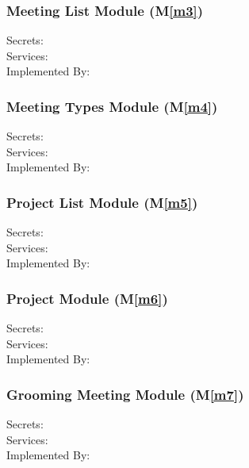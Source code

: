 \documentclass[12pt, titlepage]{article}
\newcommand{\mref}[1]{M\ref{#1}}
\begin{document}
\subsubsection{Meeting List Module (\mref{m3})}
\begin{description}
    \item[Secrets:] 
    \item[Services:] 
    \item[Implemented By:] 
\end{description}

\subsubsection{Meeting Types Module (\mref{m4})}
\begin{description}
    \item[Secrets:] 
    \item[Services:] 
    \item[Implemented By:] 
\end{description}

\subsubsection{Project List Module (\mref{m5})}
\begin{description}
    \item[Secrets:] 
    \item[Services:] 
    \item[Implemented By:] 
\end{description}

\subsubsection{Project Module (\mref{m6})}
\begin{description}
    \item[Secrets:] 
    \item[Services:] 
    \item[Implemented By:] 
\end{description}

\subsubsection{Grooming Meeting Module (\mref{m7})}
\begin{description}
    \item[Secrets:] 
    \item[Services:] 
    \item[Implemented By:] 
\end{description}
\end{document}
